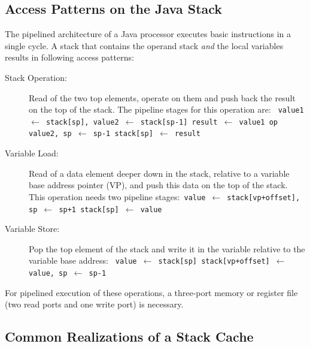 \subsection{Access Patterns on the Java Stack}
\label{subsec:access}

The pipelined architecture of a Java processor executes basic
instructions in a single cycle. A stack that contains the operand
stack \emph{and} the local variables results in following access
patterns:
%
\begin{description}
\item[Stack Operation:] Read of the two top elements, operate on them and
push back the result on the top of the stack. The pipeline stages
for this operation are:\newline
\texttt{
    value1 $\leftarrow $ stack[sp], value2 $\leftarrow $ stack[sp-1]\newline
    result $\leftarrow $ value1 op value2, sp $\leftarrow $ sp-1\newline
    stack[sp] $\leftarrow $ result
}

\item[Variable Load:] Read of a data element deeper down in the stack,
relative to a variable base address pointer (VP), and push this data
on the top of the stack. This operation needs two pipeline
stages:\newline \texttt{
    value $\leftarrow $ stack[vp+offset], sp $\leftarrow $ sp+1\newline
    stack[sp] $\leftarrow $ value
}

\item[Variable Store:] Pop the top element of the stack and write it in
the variable relative to the variable base address:\newline
\texttt{
    value $\leftarrow $ stack[sp]\newline
    stack[vp+offset] $\leftarrow $ value, sp $\leftarrow $ sp-1
}
\end{description}
%
For pipelined execution of these operations, a three-port memory or
register file (two read ports and one write port) is necessary.

\subsection{Common Realizations of a Stack Cache}

